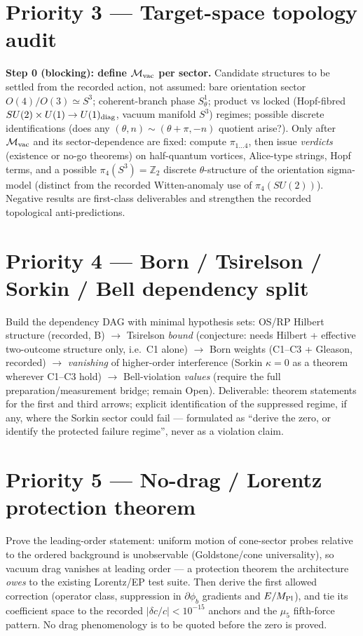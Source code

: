 \documentclass[11pt,a4paper]{article}
\begin{document}
\section{Priority 3 --- Target-space topology audit}
\label{sec:topology}
\textbf{Step 0 (blocking): define $\mathcal M_{\rm vac}$ per sector.} Candidate
structures to be settled from the recorded action, not assumed: bare orientation
sector $O(4)/O(3)\simeq S^3$; coherent-branch phase $S^1_\theta$; product vs locked
(Hopf-fibred $SU(2)\times U(1)\to U(1)_{\rm diag}$, vacuum manifold $S^3$) regimes;
possible discrete identifications (does any $(\theta,n)\sim(\theta+\pi,-n)$ quotient
arise?). Only after $\mathcal M_{\rm vac}$ and its sector-dependence are fixed:
compute $\pi_{1\ldots4}$, then issue \emph{verdicts} (existence or no-go theorems) on
half-quantum vortices, Alice-type strings, Hopf terms, and a possible
$\pi_4(S^3)=\mathbb Z_2$ discrete $\theta$-structure of the orientation sigma-model
(distinct from the recorded Witten-anomaly use of $\pi_4(SU(2))$). Negative results
are first-class deliverables and strengthen the recorded topological
anti-predictions.

\section{Priority 4 --- Born / Tsirelson / Sorkin / Bell dependency split}
\label{sec:bornsplit}
Build the dependency DAG with minimal hypothesis sets: OS/RP Hilbert structure
(recorded, B) $\to$ Tsirelson \emph{bound} (conjecture: needs Hilbert + effective
two-outcome structure only, i.e.\ C1 alone) $\to$ Born weights (C1--C3 + Gleason,
recorded) $\to$ \emph{vanishing} of higher-order interference (Sorkin
$\kappa=0$ as a theorem wherever C1--C3 hold) $\to$ Bell-violation \emph{values}
(require the full preparation/measurement bridge; remain Open). Deliverable: theorem
statements for the first and third arrows; explicit identification of the suppressed
regime, if any, where the Sorkin sector could fail --- formulated as ``derive the
zero, or identify the protected failure regime'', never as a violation claim.

\section{Priority 5 --- No-drag / Lorentz protection theorem}
\label{sec:nodrag}
Prove the leading-order statement: uniform motion of cone-sector probes relative to
the ordered background is unobservable (Goldstone/cone universality), so vacuum drag
vanishes at leading order --- a protection theorem the architecture \emph{owes} to
the existing Lorentz/EP test suite. Then derive the first allowed correction
(operator class, suppression in $\partial\phi_b$ gradients and $E/M_{\rm Pl}$), and
tie its coefficient space to the recorded $|\delta c/c|<10^{-15}$ anchors and the
$\mu_5$ fifth-force pattern. No drag phenomenology is to be quoted before the zero is
proved.
\end{document}
